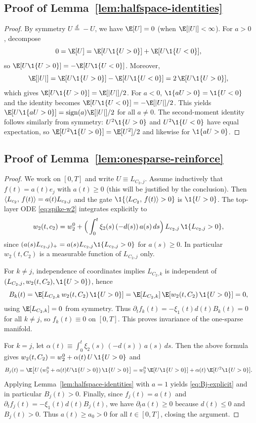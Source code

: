 
\subsection*{Proof of Lemma~\ref{lem:halfspace-identities}}
\begin{proof}
By symmetry $U\overset{d}{=}-U$, we have $\E[U]=0$ (when $\E[|U|]<\infty$).
For $a>0$, decompose
\[
0=\E[U]=\E[U\1\{U>0\}]+\E[U\1\{U<0\}],
\]
so $\E[U\1\{U>0\}]=-\E[U\1\{U<0\}]$.
Moreover,
\[
\E[|U|]=\E[U\1\{U>0\}]-\E[U\1\{U<0\}]=2\,\E[U\1\{U>0\}],
\]
which gives $\E[U\1\{U>0\}]=\E[|U|]/2$.
For $a<0$, $\1\{aU>0\}=\1\{U<0\}$ and the identity becomes $\E[U\1\{U<0\}]=-\E[|U|]/2$.
This yields $\E[U\1\{aU>0\}]=\mathrm{sign}(a)\E[|U|]/2$ for all $a\neq 0$.
The second-moment identity follows similarly from symmetry: $U^2\1\{U>0\}$ and $U^2\1\{U<0\}$ have equal expectation, so $\E[U^2\1\{U>0\}]=\E[U^2]/2$ and likewise for $\1\{aU>0\}$.
\end{proof}

\subsection*{Proof of Lemma~\ref{lem:onesparse-reinforce}}
\begin{proof}
We work on $[0,T]$ and write $U\equiv L_{C_2,j}$.
Assume inductively that $f(t)=a(t)e_j$ with $a(t)\ge 0$ (this will be justified by the conclusion).
Then $\left\langle L_{c_2},\,f(t) \right\rangle=a(t)L_{c_2,j}$ and the gate $\1\{\ip{L_{C_2}}{f(t)}>0\}$ is $\1\{U>0\}$.
The top-layer ODE \eqref{eq:spike-w2} integrates explicitly to
\[
w_2(t,c_2)=w_2^0+\Big(\int_0^t \xi_2(s)\,(-d(s))\,a(s)\,ds\Big)\,L_{c_2,j}\,\1\{L_{c_2,j}>0\},
\]
since $(a(s)L_{c_2,j})_+=a(s)L_{c_2,j}\1\{L_{c_2,j}>0\}$ for $a(s)\ge 0$.
In particular $w_2(t,C_2)$ is a measurable function of $L_{C_2,j}$ only.

For $k\neq j$, independence of coordinates implies $L_{C_2,k}$ is independent of $(L_{C_2,j},w_2(t,C_2),\1\{U>0\})$, hence
\[
B_k(t)=\E\!\left[L_{C_2,k}\,w_2(t,C_2)\,\1\{U>0\}\right]
=\E[L_{C_2,k}]\,\E\!\left[w_2(t,C_2)\,\1\{U>0\}\right]=0,
\]
using $\E[L_{C_2,k}]=0$ from symmetry.
Thus $\partial_t f_k(t)=-\xi_1(t)d(t)B_k(t)=0$ for all $k\neq j$, so $f_k(t)\equiv 0$ on $[0,T]$.
This proves invariance of the one-sparse manifold.

For $k=j$, let $\alpha(t)\equiv \int_0^t \xi_2(s)\,(-d(s))\,a(s)\,ds$.
Then the above formula gives $w_2(t,C_2)=w_2^0+\alpha(t)\,U\,\1\{U>0\}$ and
\[
B_j(t)=\E\!\left[U\,(w_2^0+\alpha(t)U\1\{U>0\})\,\1\{U>0\}\right]
=w_2^0\,\E[U\1\{U>0\}]+\alpha(t)\,\E[U^2\1\{U>0\}].
\]
Applying Lemma~\ref{lem:halfspace-identities} with $a=1$ yields \eqref{eq:Bj-explicit} and in particular $B_j(t)>0$.
Finally, since $f_j(t)=a(t)$ and $\partial_t f_j(t)=-\xi_1(t)d(t)B_j(t)$, we have $\partial_t a(t)\ge 0$ because $d(t)\le 0$ and $B_j(t)>0$.
Thus $a(t)\ge a_0>0$ for all $t\in[0,T]$, closing the argument.
\end{proof}

